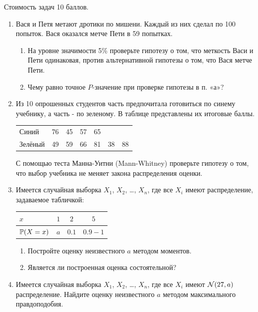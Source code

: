 Стоимость задач 10 баллов.

\begin{enumerate}
\item Вася и Петя метают дротики по мишени. Каждый из них сделал
по 100 попыток. Вася оказался метче Пети в 59 попытках.
\begin{enumerate}
\item На уровне
значимости 5\% проверьте гипотезу о том, что меткость Васи и Пети
одинаковая, против альтернативной гипотезы о том, что Вася метче
Пети.
\item Чему равно точное $P$-значение при проверке гипотезы в п. «а»?
\end{enumerate}

\item Из 10 опрошенных студентов часть предпочитала готовиться по
синему учебнику, а часть - по зеленому. В таблице представлены их
итоговые баллы.

\begin{tabular}{@{}lcccccc@{}}
\toprule
Синий   & 76 & 45 & 57 & 65 &    &    \\
Зелёный & 49 & 59 & 66 & 81 & 38 & 88 \\ \bottomrule
\end{tabular}


С помощью теста Манна-Уитни (Mann-Whitney) проверьте гипотезу о
том, что выбор учебника не меняет закона распределения оценки.

\item Имеется случайная выборка $X_{1}$, $X_{2}$, \ldots, $X_{n}$, где все $X_{i}$ имеют распределение, задаваемое табличкой:

\begin{tabular}{@{}lccc@{}}
\toprule
$x$         & $1$ & $2$   & $5$     \\ \midrule
$\P(X=x)$ & $a$ & $0.1$ & $0.9-1$ \\ \bottomrule
\end{tabular}
\begin{enumerate}
\item Постройте оценку неизвестного $a$ методом моментов.
\item Является ли построенная оценка состоятельной?
\end{enumerate}

\item Имеется случайная выборка $X_{1}$, $X_{2}$, \ldots, $X_{n}$, где все $X_{i}$ имеют $\cN(27,a)$ распределение.
Найдите оценку неизвестного $a$ методом максимального правдоподобия.


\end{enumerate}
